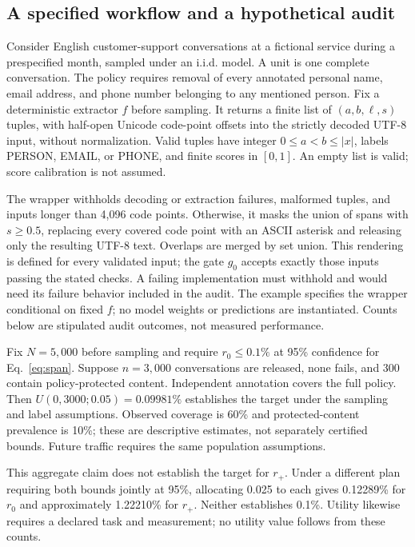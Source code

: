 \documentclass[conference]{IEEEtran}
\begin{document}
\subsection{A specified workflow and a hypothetical audit}
\label{sec:worked}
Consider English customer-support conversations at a fictional service during a prespecified month, sampled under an i.i.d. model. A unit is one complete conversation. The policy requires removal of every annotated personal name, email address, and phone number belonging to any mentioned person. Fix a deterministic extractor $f$ before sampling. It returns a finite list of $(a,b,\ell,s)$ tuples, with half-open Unicode code-point offsets into the strictly decoded UTF-8 input, without normalization. Valid tuples have integer $0\leq a<b\leq |x|$, labels PERSON, EMAIL, or PHONE, and finite scores in $[0,1]$. An empty list is valid; score calibration is not assumed.

The wrapper withholds decoding or extraction failures, malformed tuples, and inputs longer than 4,096 code points. Otherwise, it masks the union of spans with $s\geq0.5$, replacing every covered code point with an ASCII asterisk and releasing only the resulting UTF-8 text. Overlaps are merged by set union. This rendering is defined for every validated input; the gate $g_0$ accepts exactly those inputs passing the stated checks. A failing implementation must withhold and would need its failure behavior included in the audit. The example specifies the wrapper conditional on fixed $f$; no model weights or predictions are instantiated. Counts below are stipulated audit outcomes, not measured performance.

Fix $N=5{,}000$ before sampling and require $r_0\leq0.1\%$ at 95\% confidence for Eq.~\eqref{eq:span}. Suppose $n=3{,}000$ conversations are released, none fails, and 300 contain policy-protected content. Independent annotation covers the full policy. Then $U(0,3000;0.05)=0.09981\%$ establishes the target under the sampling and label assumptions. Observed coverage is 60\% and protected-content prevalence is 10\%; these are descriptive estimates, not separately certified bounds. Future traffic requires the same population assumptions.

This aggregate claim does not establish the target for $r_+$. Under a different plan requiring both bounds jointly at 95\%, allocating 0.025 to each gives 0.12289\% for $r_0$ and approximately 1.22210\% for $r_+$. Neither establishes 0.1\%. Utility likewise requires a declared task and measurement; no utility value follows from these counts.
\end{document}
